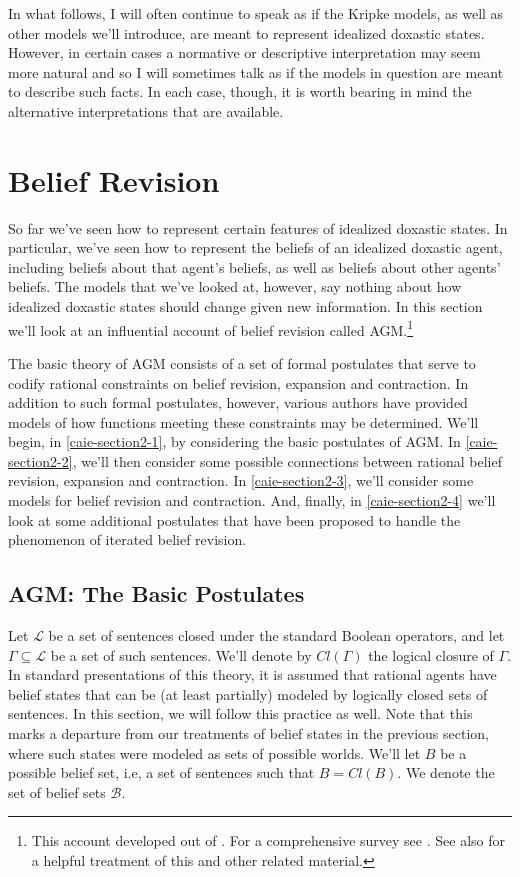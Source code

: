 In what follows, I will often continue to speak as if the Kripke models, as well as other models we'll introduce, are meant to represent idealized doxastic states.
However, in certain cases a normative or descriptive interpretation may seem more natural and so I will sometimes talk as if the models in question are meant to describe such facts.
In each case, though, it is worth bearing in mind the alternative interpretations that are available.




\section{Belief Revision}\label{caie-section2}

So far we've seen how to represent certain features of idealized doxastic states. 
In particular, we've seen how to represent the beliefs of an idealized doxastic agent, including beliefs about that agent's beliefs, as well as beliefs about other agents' beliefs. 
The models that we've looked at, however, say nothing about how idealized doxastic states should change given new information.
In this section we'll look at an influential account of belief revision called AGM.\footnote{This account developed out of \citet{AGM}. For a comprehensive survey see \citet{Gardenfors1}. See also \citet{Huber1} for a helpful treatment of this and other related material.}

The basic theory of AGM consists of a set of formal postulates that serve to codify rational constraints on belief revision, expansion and contraction.
In addition to such formal postulates, however, various authors have provided models of how functions meeting these constraints may be determined.
We'll begin, in \autoref{caie-section2-1}, by considering the basic postulates of AGM.
In \autoref{caie-section2-2}, we'll then consider some possible connections between rational belief revision, expansion and contraction.
In \autoref{caie-section2-3}, we'll consider some models for belief revision and contraction.
And, finally, in \autoref{caie-section2-4} we'll look at some additional postulates that have been proposed to handle the phenomenon of iterated belief revision. 


\subsection{AGM: The Basic Postulates}\label{caie-section2-1}


Let $\mathcal{L}$ be a set of sentences closed under the standard Boolean operators, and let $\Gamma \subseteq \mathcal{L}$ be a set of such sentences. 
We'll denote by $Cl(\Gamma)$ the logical closure of $\Gamma$.
In standard presentations of this theory, it is assumed that rational agents have belief states that can be (at least partially) modeled by logically closed sets of sentences.
In this section, we will follow this practice as well.
Note that this marks a departure from our treatments of belief states in the previous section, where such states were modeled as sets of possible worlds.
We'll let $B$ be a possible belief set, i.e, a set of sentences such that $B = Cl(B)$.
We denote the set of belief sets $\mathcal{B}$.

